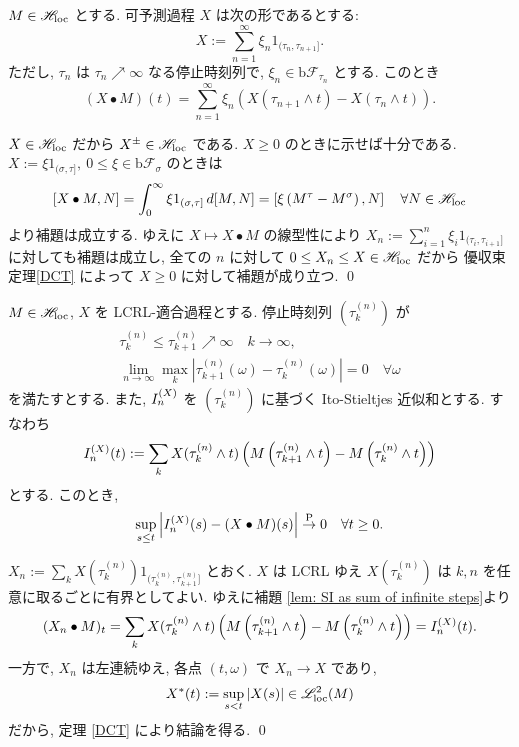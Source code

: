 \documentclass{ltjsarticle}
\begin{document}
\begin{lem}	\label{lem: SI as sum of infinite steps}
	\( M \in \mathscr{H}_{\mathrm{loc}} \) とする. 可予測過程 \( X \) は次の形であるとする:
	\[
		X	:= \sum_{ n = 1}^{ \infty } \xi_n 1_{ (\tau_n,\tau_{ n + 1 }] }.
	\]
	ただし, \( \tau_n \) は \( \tau_n \nearrow \infty \) なる停止時刻列で,
	\( \xi_n \in \mathrm{b}\mathscr{F}_{\tau_n} \) とする.
	このとき
	\[
		\left( X \bullet M \right)(t)
		=	\sum_{ n = 1}^{ \infty } \xi_n 
		\left(	
		X( \tau_{ n + 1 } \wedge t ) - X( \tau_n \wedge t )
		\right).
	\]
\end{lem}
\begin{prf}
	\( X \in \mathscr{H}_{\mathrm{loc}} \) だから \( X^{\pm} \in \mathscr{H}_{\mathrm{loc}} \) である.
	\( X \ge 0 \) のときに示せば十分である.
	\( X := \xi 1_{ (\sigma,\tau] },\ 0 \le \xi \in \mathrm{b}\mathscr{F}_{\sigma} \)
	のときは
	\[
		[ X \bullet M, N ]
		=	\int_0^{\infty} \xi 1_{ (\sigma,\tau] }\, d[M,N]
		=	\left[ \xi \left( M^{\tau} - M^{\sigma} \right), N \right]
		\quad \forall N \in \mathscr{H}_{\mathrm{loc}}
	\]
	より補題は成立する.
	ゆえに
	\( X \mapsto X \bullet M \)
	の線型性により
	\( X_n := \sum_{ i=1 }^n \xi_i 1_{ (\tau_i, \tau_{ i + 1 }] } \)
	に対しても補題は成立し, 
	全ての \( n \) に対して \( 0 \le X_n \le X \in \mathscr{H}_{\mathrm{loc}} \) だから
	優収束定理\ref{DCT} によって \( X \ge 0 \) に対して補題が成り立つ.
	\qed\end{prf}


\begin{thm} \label{relation with IS integral}
	\( M \in \mathscr{H}_{\mathrm{loc}} \), \( X \) を LCRL-適合過程とする.
	停止時刻列 \( \left( \tau_k^{ ( n ) } \right) \) が
	\begin{align*}
		\tau_k^{ ( n ) } \le \tau_{ k + 1 }^{ ( n ) } \nearrow \infty
		\quad k \to \infty,
		\\
		\lim_{ n \to \infty } \max_{k}
		\left| \tau_{ k + 1 }^{ ( n ) } ( \omega ) - \tau_k^{ ( n ) } ( \omega ) \right| = 0
		\quad \forall \omega
	\end{align*}
	を満たすとする.
	また, \( I_n^{ (X) } \) を \( \left( \tau_k^{ ( n ) } \right) \) に基づく Ito-Stieltjes 近似和とする. すなわち
	\[
		I_n^{ (X) }(t)	:=
		\sum_k	X( \tau_k^{ ( n ) } \wedge t )
		\left(
		M \left( \tau_{ k + 1 }^{ ( n ) } \wedge t \right)
		- M \left( \tau_{ k }^{ ( n ) } \wedge t \right)
		\right)
	\]
	とする.
	このとき,
	\[
		\sup_{ s \le t } \left| I_n^{ (X) }(s) - ( X \bullet M )(s) \right| \stackrel{ \mathrm{P} }{ \to } 0
		\quad \forall t \ge 0.
	\]
\end{thm}
\begin{prf}
	\( X_n := \sum_k X( \tau_k^{ ( n ) } ) 1_{ (\tau_{ k }^{ ( n ) }, \tau_{ k + 1 }^{ ( n ) }] } \)
	とおく.
	\( X \) は LCRL ゆえ \( X( \tau_k^{ ( n ) } ) \) は \( k, n \) を任意に取るごとに有界としてよい.
	ゆえに補題 \ref{lem: SI as sum of infinite steps}より
	\[
		( X_n \bullet M )_t
		=
		\sum_k	X( \tau_k^{ ( n ) } \wedge t )
		\left(
		M \left( \tau_{ k + 1 }^{ ( n ) } \wedge t \right)
		- M \left( \tau_{ k }^{ ( n ) } \wedge t \right)
		\right)
		= I_n^{ (X) } (t).
	\]
	一方で, \( X_n \) は左連続ゆえ, 各点 \( ( t, \omega ) \) で \( X_n \to X \) であり,
	\[
		X^{*}(t) := \sup_{ s < t } \left| X(s) \right| \in \mathscr{L}^2_{\mathrm{loc}}(M)
	\]
	だから, 定理 \ref{DCT} により結論を得る.
	\qed\end{prf}
\end{document}
